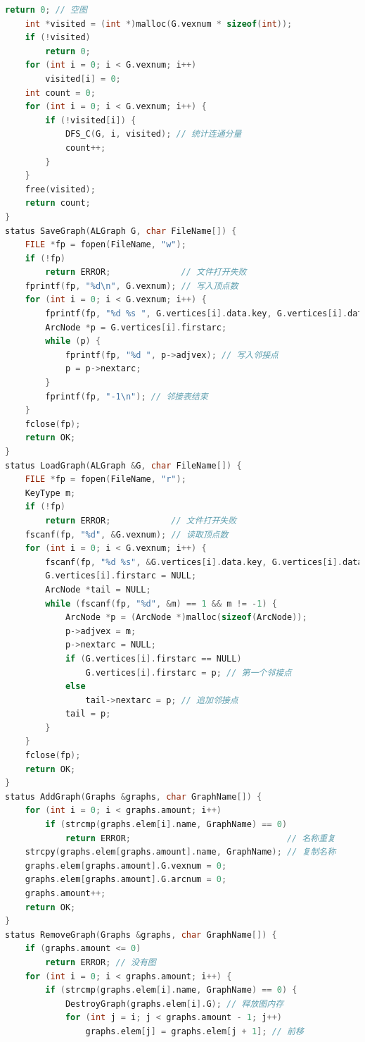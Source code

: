 \documentclass[supercite]{Experimental_Report}
\theoremstyle{definition}
\begin{document}
\begin{lstlisting}[language=c]
        return 0; // 空图
    int *visited = (int *)malloc(G.vexnum * sizeof(int));
    if (!visited)
        return 0;
    for (int i = 0; i < G.vexnum; i++)
        visited[i] = 0;
    int count = 0;
    for (int i = 0; i < G.vexnum; i++) {
        if (!visited[i]) {
            DFS_C(G, i, visited); // 统计连通分量
            count++;
        }
    }
    free(visited);
    return count;
}
status SaveGraph(ALGraph G, char FileName[]) {
    FILE *fp = fopen(FileName, "w");
    if (!fp)
        return ERROR;              // 文件打开失败
    fprintf(fp, "%d\n", G.vexnum); // 写入顶点数
    for (int i = 0; i < G.vexnum; i++) {
        fprintf(fp, "%d %s ", G.vertices[i].data.key, G.vertices[i].data.others); // 写入顶点信息
        ArcNode *p = G.vertices[i].firstarc;
        while (p) {
            fprintf(fp, "%d ", p->adjvex); // 写入邻接点
            p = p->nextarc;
        }
        fprintf(fp, "-1\n"); // 邻接表结束
    }
    fclose(fp);
    return OK;
}
status LoadGraph(ALGraph &G, char FileName[]) {
    FILE *fp = fopen(FileName, "r");
    KeyType m;
    if (!fp)
        return ERROR;            // 文件打开失败
    fscanf(fp, "%d", &G.vexnum); // 读取顶点数
    for (int i = 0; i < G.vexnum; i++) {
        fscanf(fp, "%d %s", &G.vertices[i].data.key, G.vertices[i].data.others); // 读取顶点信息
        G.vertices[i].firstarc = NULL;
        ArcNode *tail = NULL;
        while (fscanf(fp, "%d", &m) == 1 && m != -1) {
            ArcNode *p = (ArcNode *)malloc(sizeof(ArcNode));
            p->adjvex = m;
            p->nextarc = NULL;
            if (G.vertices[i].firstarc == NULL)
                G.vertices[i].firstarc = p; // 第一个邻接点
            else
                tail->nextarc = p; // 追加邻接点
            tail = p;
        }
    }
    fclose(fp);
    return OK;
}
status AddGraph(Graphs &graphs, char GraphName[]) {
    for (int i = 0; i < graphs.amount; i++)
        if (strcmp(graphs.elem[i].name, GraphName) == 0)
            return ERROR;                               // 名称重复
    strcpy(graphs.elem[graphs.amount].name, GraphName); // 复制名称
    graphs.elem[graphs.amount].G.vexnum = 0;
    graphs.elem[graphs.amount].G.arcnum = 0;
    graphs.amount++;
    return OK;
}
status RemoveGraph(Graphs &graphs, char GraphName[]) {
    if (graphs.amount <= 0)
        return ERROR; // 没有图
    for (int i = 0; i < graphs.amount; i++) {
        if (strcmp(graphs.elem[i].name, GraphName) == 0) {
            DestroyGraph(graphs.elem[i].G); // 释放图内存
            for (int j = i; j < graphs.amount - 1; j++)
                graphs.elem[j] = graphs.elem[j + 1]; // 前移

\end{lstlisting}
\end{document}
